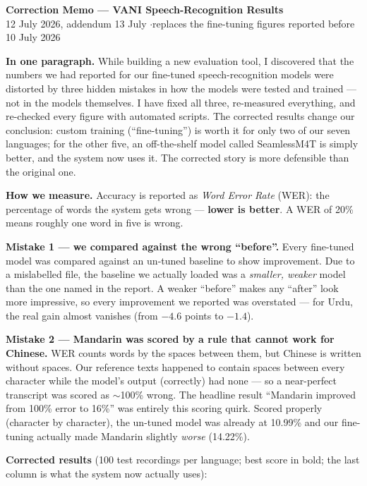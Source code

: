 \documentclass[10pt,a4paper]{article}
\begin{document}
\begin{center}
{\Large\bfseries Correction Memo --- VANI Speech-Recognition Results}\\[2pt]
{\small 12 July 2026, addendum 13 July \quad$\cdot$\quad replaces the fine-tuning figures reported before 10 July 2026}
\end{center}

\textbf{In one paragraph.} While building a new evaluation tool, I discovered that the numbers we had
reported for our fine-tuned speech-recognition models were distorted by three hidden mistakes in how the
models were tested and trained --- not in the models themselves. I have fixed all three, re-measured
everything, and re-checked every figure with automated scripts. The corrected results change our
conclusion: custom training (``fine-tuning'') is worth it for only two of our seven languages; for the
other five, an off-the-shelf model called SeamlessM4T is simply better, and the system now uses it.
The corrected story is more defensible than the original one.

\textbf{How we measure.} Accuracy is reported as \emph{Word Error Rate} (WER): the percentage of words
the system gets wrong --- \textbf{lower is better}. A WER of 20\% means roughly one word in five is wrong.

\textbf{Mistake 1 --- we compared against the wrong ``before''.} Every fine-tuned model was compared
against an un-tuned baseline to show improvement. Due to a mislabelled file, the baseline we actually
loaded was a \emph{smaller, weaker} model than the one named in the report. A weaker ``before'' makes
any ``after'' look more impressive, so every improvement we reported was overstated --- for Urdu, the
real gain almost vanishes (from $-4.6$ points to $-1.4$).

\textbf{Mistake 2 --- Mandarin was scored by a rule that cannot work for Chinese.} WER counts words by
the spaces between them, but Chinese is written without spaces. Our reference texts happened to contain
spaces between every character while the model's output (correctly) had none --- so a near-perfect
transcript was scored as $\sim$100\% wrong. The headline result ``Mandarin improved from 100\% error to
16\%'' was entirely this scoring quirk. Scored properly (character by character), the un-tuned model was
already at 10.99\% and our fine-tuning actually made Mandarin slightly \emph{worse} (14.22\%).

\textbf{Corrected results} (100 test recordings per language; best score in bold; the last column is what
the system now actually uses):
\end{document}
